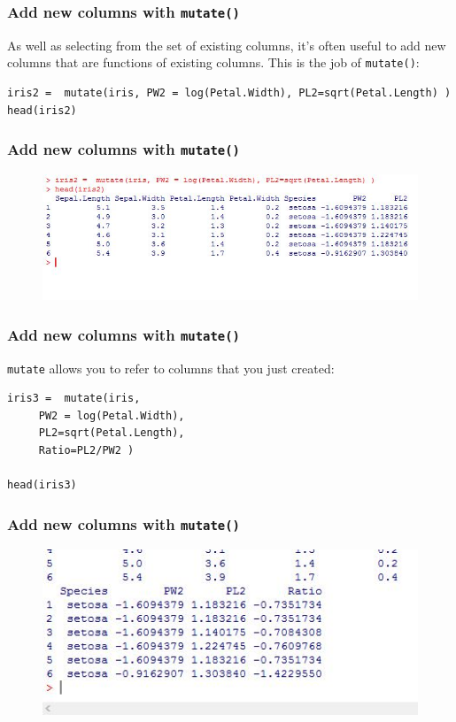 \documentclass{beamer}
\begin{document}
\begin{frame}[fragile]
\frametitle{Add new columns with \texttt{mutate()} }

As well as selecting from the set of existing columns, it’s often useful to add new columns that are functions of existing columns. This is the job of \texttt{mutate()}:

\begin{framed}
\begin{verbatim}
iris2 =  mutate(iris, PW2 = log(Petal.Width), PL2=sqrt(Petal.Length) )
head(iris2)
\end{verbatim}
\end{framed}
\end{frame}
\begin{frame}
	
	\frametitle{Add new columns with \texttt{mutate()} }
	\begin{figure}
\centering
\includegraphics[width=0.9\linewidth]{irismutate}

\end{figure}

\end{frame}
\begin{frame}[fragile]
	
	\frametitle{Add new columns with \texttt{mutate()} }
\texttt{mutate} allows you to refer to columns that you just created:

\begin{verbatim}
iris3 =  mutate(iris, 
     PW2 = log(Petal.Width), 
     PL2=sqrt(Petal.Length), 
     Ratio=PL2/PW2 )
     
head(iris3)
\end{verbatim}
\end{frame} 
\begin{frame}

\frametitle{Add new columns with \texttt{mutate()} }
	\begin{figure}
		\centering
		\includegraphics[width=0.9\linewidth]{irismutate2}
		
	\end{figure}
	
\end{frame}


\end{document}
